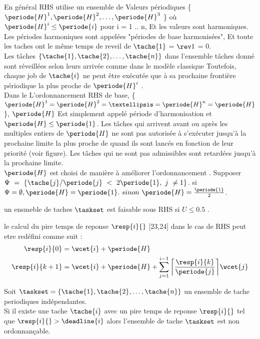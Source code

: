 En général RHS utilise un ensemble de Valeurs périodiques \{ $\periode{H}^1,\periode{H}^2,\dots ,\periode{H}^3$ \} où $\periode{H}^i \leq \periode{i}$ pour i = 1 .. n, Et les valeurs sont harmoniques. Les périodes harmoniques sont appelées "périodes de base harmonisées", Et toute les taches ont le même temps de reveil de $\tache{1}$ = $\rev1$ = 0.
\\ Les tâches $\{\tache{1}, \tache{2}, \dots, \tache{n} \}$ dans l’ensemble tâches donné sont réveillées selon leurs arrivée comme dans le modèle classique Toutefois, chaque job de $\tache{i}$ ne peut être exécutée que à sa prochaine frontière périodique la plus proche de $\periode{H}^i$ \cite{Rowe10}.
\\ \indent Dans le L’ordonnancement RHS de base, \{ $\periode{H}^1 = \periode{H}^2 = … = \periode{H}^n = \periode{H}$ \}, $\periode{H}$ Est simplement appelé période d'harmonisation et $\periode{H} \leq \periode{1}$. Les tâches qui arrivent avant ou après les multiples entiers de $\periode{H}$ ne sont pas autorisée à s'exécuter jusqu'à la prochaine limite la plus proche de quand ils sont lancés en fonction de leur priorité (voir figure). Les tâches qui ne sont pas admissibles sont retardées jusqu'à la prochaine limite.
\\ \indent $\periode{H}$ est choisi de manière à améliorer l'ordonnancement \cite{Rowe10}. Supposer $\Psi~=~\{ \tache{j} / \periode{j}~<~2\periode{1},~j~\neq 1\}$. si $\Psi = \emptyset, \periode{H} = \periode{1}.~sinon~\periode{H} = \frac{\periode{1}}{2}$. 

\begin{theoreme}
un ensmeble de taches $\taskset$ est faisable sous RHS si $U \leq 0.5$ .
\end{theoreme}

\begin{theoreme}
le calcul du pire temps de reponse $\resp{i}{}$ [23,24] dans le cas de RHS peut etre redéfini comme suit :
\\ 
\begin{align}
\resp{i}{0} & = \wcet{i} + \periode{H} 
\\ \resp{i}{k+1} & = \wcet{i} + \periode{H} + \sum_{j = 1}^{i-1} \bigg \lceil \frac{\resp{i}{k}}{\periode{j}}\bigg \rceil \wcet{j}
\end{align}
\end{theoreme}

\begin{theoreme}
Soit $\taskset = \{\tache{1}, \tache{2}, \dots, \tache{n} \}$ un ensemble de tache periodiques indépendantes. \\
Si il existe une tache $\tache{i}$ avec un pire temps de reponse $\resp{i}{}$ tel que $\resp{i}{} > \deadline{i}$ alors l'ensemble de tache $\taskset$ est non ordonnançable.
\end{theoreme}
